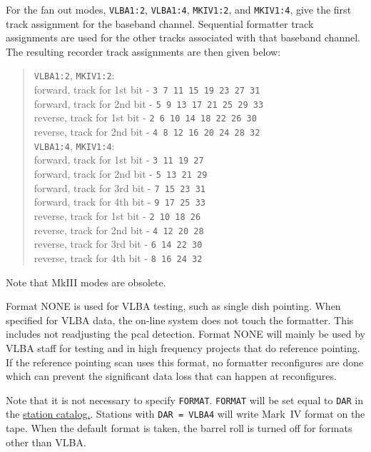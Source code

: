 \documentclass{report}
\begin{document}
For the fan out modes, {\tt VLBA1:2}, {\tt VLBA1:4}, {\tt MKIV1:2}, and
{\tt MKIV1:4}, give the first track assignment for the baseband
channel. Sequential formatter track assignments are used for the other
tracks associated with that baseband channel. The resulting recorder
track assignments are then given below:
\begin{verse}
{\tt VLBA1:2}, {\tt MKIV1:2}: \\
forward, track for 1st bit - {\tt 3 7 11 15 19 23 27 31} \\
forward, track for 2nd bit - {\tt 5 9 13 17 21 25 29 33} \\
reverse, track for 1st bit - {\tt 2 6 10 14 18 22 26 30} \\
reverse, track for 2nd bit - {\tt 4 8 12 16 20 24 28 32} \\
{\tt VLBA1:4}, {\tt MKIV1:4}: \\
forward, track for 1st bit - {\tt 3 11 19 27} \\
forward, track for 2nd bit - {\tt 5 13 21 29} \\
forward, track for 3rd bit - {\tt 7 15 23 31} \\
forward, track for 4th bit - {\tt 9 17 25 33} \\
reverse, track for 1st bit - {\tt 2 10 18 26} \\
reverse, track for 2nd bit - {\tt 4 12 20 28} \\
reverse, track for 3rd bit - {\tt 6 14 22 30} \\
reverse, track for 4th bit - {\tt 8 16 24 32} \\
\end{verse}

Note that MkIII modes are obsolete.

Format NONE is used for VLBA testing, such as single dish pointing.
When specified for VLBA data, the on-line system does not touch the
formatter.  This includes not readjusting the pcal detection.
Format NONE will mainly be used by VLBA staff for testing and in
high frequency projects that do reference pointing.  If the reference
pointing scan uses this format, no formatter reconfigures are done
which can prevent the significant data loss that can happen at
reconfigures.

Note that it is not necessary to specify {\tt FORMAT}.  {\tt FORMAT}
will be set equal to {\tt DAR} in the 
{\hyperref[SEC:STACAT]{station catalog.}}.
Stations with {\tt DAR = VLBA4} will write Mark~IV
format on the tape.  When the default format is taken, the barrel roll
is turned off for formats other than VLBA.
\end{document}
